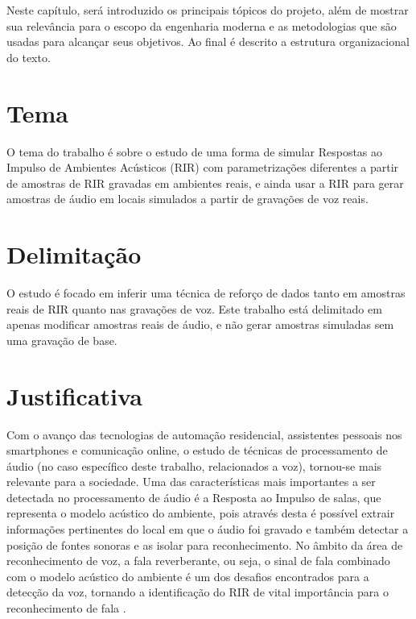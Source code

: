 Neste capítulo, será introduzido os principais tópicos do projeto, além de mostrar sua relevância para o escopo da engenharia moderna
e as metodologias que são usadas para alcançar seus objetivos. Ao final é descrito a estrutura organizacional do texto.

\section{Tema}

O tema do trabalho é sobre o estudo de uma forma de simular Respostas ao Impulso de Ambientes Acústicos (RIR) com parametrizações diferentes a partir de amostras 
de RIR gravadas em ambientes reais, e ainda usar a RIR para gerar amostras de áudio em locais simulados a partir de gravações de voz reais.

\section{Delimitação}

O estudo é focado em inferir uma técnica de reforço de dados tanto em amostras reais de RIR quanto nas gravações de voz. Este trabalho está delimitado em apenas 
modificar amostras reais de áudio, e não gerar amostras simuladas sem uma gravação de base.


\section{Justificativa}

Com o avanço das tecnologias de automação residencial, assistentes pessoais nos smartphones e comunicação online, o estudo de técnicas de
processamento de áudio (no caso específico deste trabalho, relacionados a voz), tornou-se mais relevante para a sociedade.
Uma das características mais importantes a ser detectada no processamento de áudio é a Resposta ao Impulso de salas, 
que representa o modelo acústico do ambiente, pois através desta é possível extrair informações pertinentes do local em que o áudio foi gravado
e também detectar a posição de fontes sonoras e as isolar para reconhecimento.
No âmbito da área de reconhecimento de voz, a fala reverberante, ou seja, o sinal de fala combinado com o modelo acústico do ambiente
é um dos desafios encontrados para a detecção da voz, tornando a identificação do RIR de vital importância para o reconhecimento de fala \cite{FAR-FIELD_ASR}.

